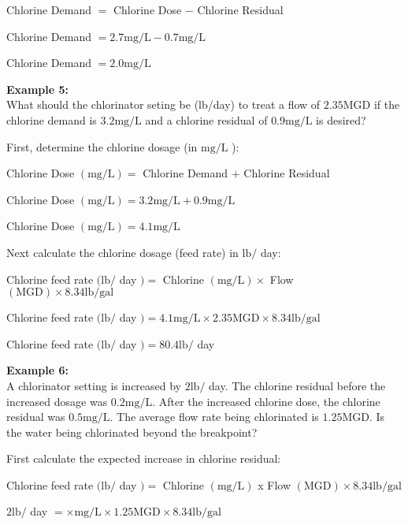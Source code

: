 \documentclass{article}
\begin{document}
Chlorine Demand $=$ Chlorine Dose $-$ Chlorine Residual

Chlorine Demand $=2.7 \mathrm{mg} / \mathrm{L}-0.7 \mathrm{mg} / \mathrm{L}$

Chlorine Demand $=2.0 \mathrm{mg} / \mathrm{L}$

\textbf{Example 5:}\\
What should the chlorinator seting be (lb/day) to treat a flow of $2.35 \mathrm{MGD}$ if the chlorine demand is $3.2 \mathrm{mg} / \mathrm{L}$ and a chlorine residual of $0.9 \mathrm{mg} / \mathrm{L}$ is desired?

First, determine the chlorine dosage (in $\mathrm{mg} / \mathrm{L}$ ):

Chlorine Dose $(\mathrm{mg} / \mathrm{L})=$ Chlorine Demand $+$ Chlorine Residual

Chlorine Dose $(\mathrm{mg} / \mathrm{L})=3.2 \mathrm{mg} / \mathrm{L}+0.9 \mathrm{mg} / \mathrm{L}$

Chlorine Dose $(\mathrm{mg} / \mathrm{L})=4.1 \mathrm{mg} / \mathrm{L}$

Next calculate the chlorine dosage (feed rate) in $\mathrm{lb} /$ day:

Chlorine feed rate $(\mathrm{lb} /$ day $)=$ Chlorine $(\mathrm{mg} / \mathrm{L}) \times$ Flow $(\mathrm{MGD}) \times 8.34 \mathrm{lb} / \mathrm{gal}$

Chlorine feed rate $(\mathrm{lb} /$ day $)=4.1 \mathrm{mg} / \mathrm{L} \times 2.35 \mathrm{MGD} \times 8.34 \mathrm{lb} / \mathrm{gal}$

Chlorine feed rate $(\mathrm{lb} /$ day $)=80.4 \mathrm{lb} /$ day


\textbf{Example 6:}\\
A chlorinator setting is increased by $2 \mathrm{lb} /$ day. The chlorine residual before the increased dosage was $0.2 \mathrm{mg} / \mathrm{L}$. After the increased chlorine dose, the chlorine residual was $0.5 \mathrm{mg} / \mathrm{L}$. The average flow rate being chlorinated is $1.25 \mathrm{MGD}$. Is the water being chlorinated beyond the breakpoint?

First calculate the expected increase in chlorine residual:

Chlorine feed rate $(\mathrm{lb} /$ day $)=$ Chlorine $(\mathrm{mg} / \mathrm{L})$ x Flow $(\mathrm{MGD}) \times 8.34 \mathrm{lb} / \mathrm{gal}$

$2 \mathrm{lb} /$ day $=\times \mathrm{mg} / \mathrm{L} \times 1.25 \mathrm{MGD} \times 8.34 \mathrm{lb} / \mathrm{gal}$
\end{document}
